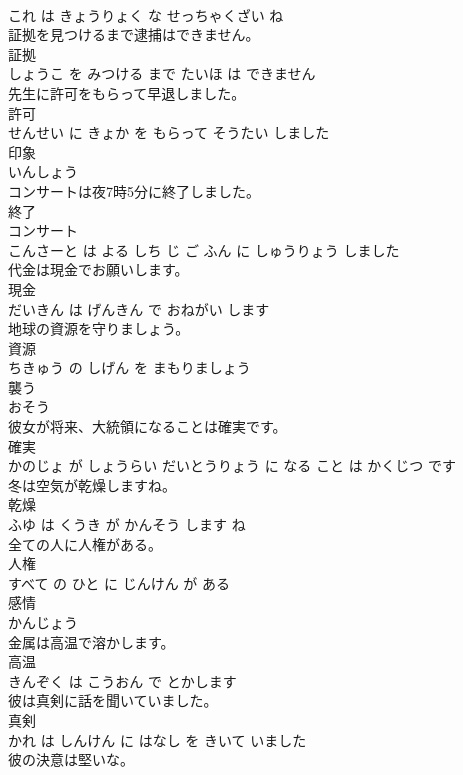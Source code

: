 \documentclass[8pt]{extreport}
\begin{document}
\begin{CJK}{UTF8}{min}
\\	これ は きょうりょく な せっちゃくざい ね		
\\	証拠を見つけるまで逮捕はできません。	
\\	証拠 
\\	しょうこ を みつける まで たいほ は できません		
\\	先生に許可をもらって早退しました。	
\\	許可 
\\	せんせい に きょか を もらって そうたい しました		
\\	印象	
\\	いんしょう		
\\	コンサートは夜7時5分に終了しました。	
\\	終了 
\\	コンサート 
\\	こんさーと は よる しち じ ご ふん に しゅうりょう しました		
\\	代金は現金でお願いします。	
\\	現金 
\\	だいきん は げんきん で おねがい します		
\\	地球の資源を守りましょう。	
\\	資源 
\\	ちきゅう の しげん を まもりましょう		
\\	襲う	
\\	おそう		
\\	彼女が将来、大統領になることは確実です。	
\\	確実 
\\	かのじょ が しょうらい だいとうりょう に なる こと は かくじつ です		
\\	冬は空気が乾燥しますね。	
\\	乾燥 
\\	ふゆ は くうき が かんそう します ね		
\\	全ての人に人権がある。	
\\	人権 
\\	すべて の ひと に じんけん が ある		
\\	感情	
\\	かんじょう		
\\	金属は高温で溶かします。	
\\	高温 
\\	きんぞく は こうおん で とかします		
\\	彼は真剣に話を聞いていました。	
\\	真剣 
\\	かれ は しんけん に はなし を きいて いました		
\\	彼の決意は堅いな。	

\end{CJK}
\end{document}

